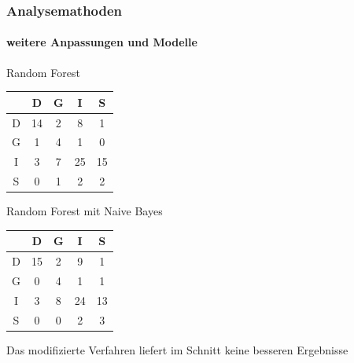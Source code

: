 \documentclass{beamer}
\begin{document}
\begin{frame}
 \frametitle{Analysemathoden}
 \framesubtitle{weitere Anpassungen und Modelle}
 
 \begin{minipage}{0.45\textwidth}
  
 Random Forest\\
 \begin{center}
 \begin{tabular}{c|c|c|c|c|}
                &  D     & G  & I     & S\\
  \hline
  D      & 14            & 2             & 8             & 1 \\
  G  & 1             & 4             & 1             & 0\\
  I     & 3             & 7             & 25            & 15\\
  S        & 0             & 1             & 2             & 2
 \end{tabular}
 \end{center}
 \end{minipage}
 \begin{minipage}{0.45\textwidth}
 Random Forest mit Naive Bayes\\
 \begin{center}
  \begin{tabular}{c|c|c|c|c|}
      &  D    & G   & I     & S\\
  \hline
  D   & 15    & 2   & 9             & 1 \\
  G   & 0     & 4   & 1             & 1\\
  I   & 3     & 8   & 24            & 13\\
  S   & 0     & 0   & 2             & 3
 \end{tabular}
 \end{center}
 \end{minipage}

 
 
 \vspace{12pt}
 Das modifizierte Verfahren liefert im Schnitt keine besseren Ergebnisse
\end{frame}
\end{document}
